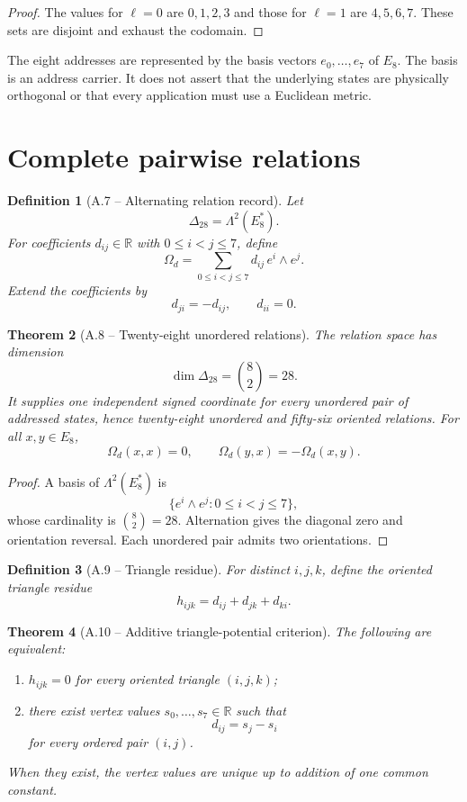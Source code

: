 \documentclass[11pt,letterpaper]{article}
\theoremstyle{relationstyle}
\newtheorem{theorem}{Theorem}[section]
\newtheorem{definition}[theorem]{Definition}
\newcommand{\R}{\mathbb{R}}
\newcommand{\wedgeTwo}{\Lambda^2}
\begin{document}
\begin{proof}
The values for $\ell=0$ are $0,1,2,3$ and those for $\ell=1$ are $4,5,6,7$.  These sets are disjoint and exhaust the codomain.
\end{proof}

The eight addresses are represented by the basis vectors $e_0,\ldots,e_7$ of $E_8$.  The basis is an address carrier.  It does not assert that the underlying states are physically orthogonal or that every application must use a Euclidean metric.

\section{Complete pairwise relations}\label{sec:relations}

\begin{definition}[A.7 -- Alternating relation record]
Let
\[
\Delta_{28}=\wedgeTwo(E_8^*).
\]
For coefficients $d_{ij}\in\R$ with $0\le i<j\le7$, define
\[
\Omega_d=\sum_{0\le i<j\le7}d_{ij}\,e^i\wedge e^j.
\]
Extend the coefficients by
\[
d_{ji}=-d_{ij},
\qquad
d_{ii}=0.
\]
\end{definition}

\begin{theorem}[A.8 -- Twenty-eight unordered relations]\label{thm:28}
The relation space has dimension
\[
\dim\Delta_{28}=\binom82=28.
\]
It supplies one independent signed coordinate for every unordered pair of addressed states, hence twenty-eight unordered and fifty-six oriented relations.  For all $x,y\in E_8$,
\[
\Omega_d(x,x)=0,
\qquad
\Omega_d(y,x)=-\Omega_d(x,y).
\]
\end{theorem}

\begin{proof}
A basis of $\Lambda^2(E_8^*)$ is
\[
\{e^i\wedge e^j:0\le i<j\le7\},
\]
whose cardinality is $\binom82=28$.  Alternation gives the diagonal zero and orientation reversal.  Each unordered pair admits two orientations.
\end{proof}

\begin{definition}[A.9 -- Triangle residue]
For distinct $i,j,k$, define the oriented triangle residue
\[
h_{ijk}=d_{ij}+d_{jk}+d_{ki}.
\]
\end{definition}

\begin{theorem}[A.10 -- Additive triangle-potential criterion]\label{thm:triangle}
The following are equivalent:
\begin{enumerate}
  \item $h_{ijk}=0$ for every oriented triangle $(i,j,k)$;
  \item there exist vertex values $s_0,\ldots,s_7\in\R$ such that
  \[
  d_{ij}=s_j-s_i
  \]
  for every ordered pair $(i,j)$.
\end{enumerate}
When they exist, the vertex values are unique up to addition of one common constant.
\end{theorem}
\end{document}
